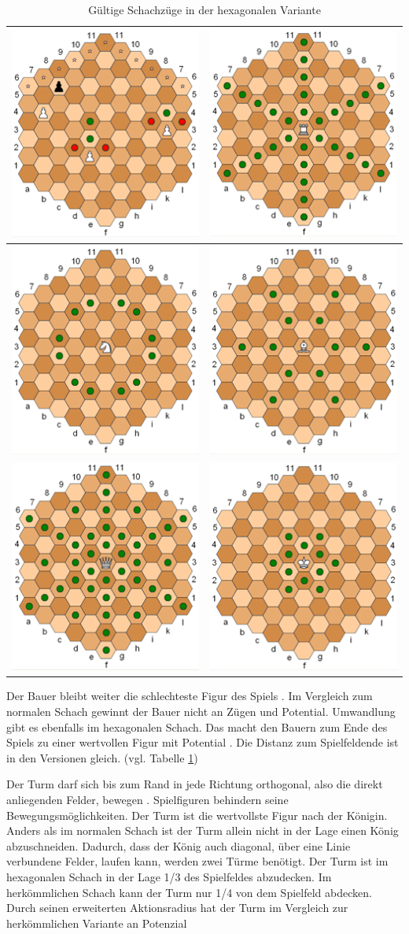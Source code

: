 \begin{table}[H]
    \centering
    \begin{tabular}{|c|c|}
        \hline
        \includegraphics{images/hexPawn.png} & \includegraphics{images/hexRook.png} \\ \hline \includegraphics{images/hexKnight.png} & \includegraphics{images/hexBishop.png} \\ \hline \includegraphics{images/hexQueen.png} & \includegraphics{images/hexKing.png} \\ \hline
    \end{tabular}
    \caption{Gültige Schachzüge in der hexagonalen Variante \protect\footnotemark}
    \label{tab:posMove}
\end{table}

\newpage
Der Bauer bleibt weiter die schlechteste Figur des Spiels \cite{GlinskiHexaChess}. Im Vergleich zum normalen Schach gewinnt der Bauer nicht an Zügen und Potential. Umwandlung gibt es ebenfalls im hexagonalen Schach. Das macht den Bauern zum Ende des Spiels zu einer wertvollen Figur mit Potential \cite{chessvar}. Die Distanz zum Spielfeldende ist in den Versionen gleich. (vgl. Tabelle \ref{tab:posMove})\par
Der Turm darf sich bis zum Rand in jede Richtung orthogonal, also die direkt anliegenden Felder, bewegen \cite{GlinskiHexaChess}. Spielfiguren behindern seine Bewegungsmöglichkeiten. Der Turm ist die wertvollste Figur nach der Königin. Anders als im normalen Schach ist der Turm allein nicht in der Lage einen König abzuschneiden. Dadurch, dass der König auch diagonal, über eine Linie verbundene Felder, laufen kann, werden zwei Türme benötigt. Der Turm ist im hexagonalen Schach in der Lage 1/3 des Spielfeldes abzudecken. Im herkömmlichen Schach kann der Turm nur 1/4 von dem Spielfeld abdecken. Durch seinen erweiterten Aktionsradius hat der Turm im Vergleich zur herkömmlichen Variante an Potenzial 